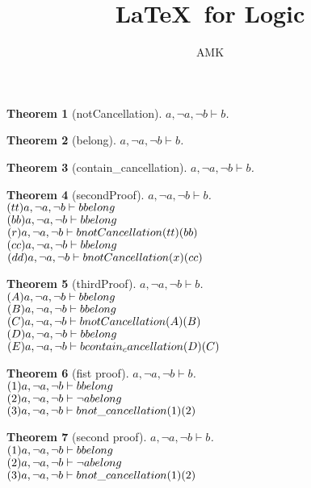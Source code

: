 \documentclass[11pt]{article}
\title{\textbf{\LaTeX\ for Logic}}
\author{AMK}
\newtheorem{theorem}{Theorem}
\def\turn{\vdash}
\begin{document}
\maketitle
\begin{theorem}[notCancellation] $ a, \neg a, \neg b \turn b $.\\
\end{theorem}
\begin{theorem}[belong] $ a, \neg a, \neg b \turn b $.\\
\end{theorem}
\begin{theorem}[contain_cancellation] $ a, \neg a, \neg b \turn b $.\\
\end{theorem}
\begin{theorem}[secondProof] $ a, \neg a, \neg b \turn b $.\\
$(tt)a, \neg a, \neg b \turn b \hfill belong  $\\
$(bb)a, \neg a, \neg b \turn b \hfill belong  $\\
$(r)a, \neg a, \neg b \turn b \hfill notCancellation (tt)(bb) $\\
$(cc)a, \neg a, \neg b \turn b \hfill belong  $\\
$(dd)a, \neg a, \neg b \turn b \hfill notCancellation (x)(cc) $\\
\end{theorem}
\begin{theorem}[thirdProof] $ a, \neg a, \neg b \turn b $.\\
$(A)a, \neg a, \neg b \turn b \hfill belong  $\\
$(B)a, \neg a, \neg b \turn b \hfill belong  $\\
$(C)a, \neg a, \neg b \turn b \hfill notCancellation (A)(B) $\\
$(D)a, \neg a, \neg b \turn b \hfill belong  $\\
$(E)a, \neg a, \neg b \turn b \hfill contain_cancellation (D)(C) $\\
\end{theorem}
\begin{theorem}[fist proof] $ a, \neg a, \neg b \turn b $.\\
$(1)a, \neg a, \neg b \turn b \hfill belong $\\
$(2)a, \neg a, \neg b \turn \neg a \hfill belong $\\
$(3)a, \neg a, \neg b \turn b \hfill not \_ cancellation (1)(2) $\\
\end{theorem}
\begin{theorem}[second proof] $ a, \neg a, \neg b \turn b $.\\
$(1)a, \neg a, \neg b \turn b \hfill belong $\\
$(2)a, \neg a, \neg b \turn \neg a \hfill belong $\\
$(3)a, \neg a, \neg b \turn b \hfill not \_ cancellation (1)(2) $\\
\end{theorem}
\end{document}
